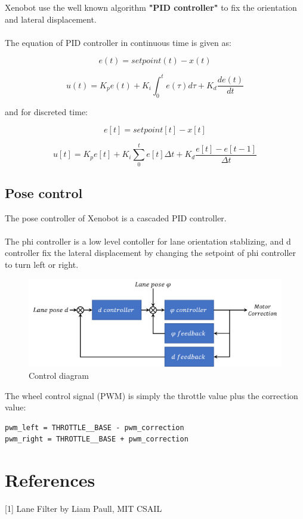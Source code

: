 \documentclass{article}
\begin{document}
Xenobot use the well known algorithm \textbf{"PID controller"} to fix the orientation and lateral displacement.
\\
\\
The equation of PID controller in continuous time is given as:

\[e(t) = setpoint(t) - x(t)\]

\[u(t) = K_p e(t) + K_i \int_{0}^{t} e(\tau) d\tau + K_d  \frac{de(t)}{dt}\]

\noindent and for discreted time:

\[e[t] = setpoint[t] - x[t]\]

\[u[t] = K_p e[t] + K_i \sum_0^t e[t] \Delta t + K_d \frac{e[t] - e[t-1]}{\Delta t}\]

\subsection{Pose control}

The pose controller of Xenobot is a cascaded PID controller.
\\
\\
The phi controller is a low level contoller for lane orientation stablizing, and d controller fix the lateral displacement by changing the setpoint of phi controller to turn left or right.

\begin{figure}[ht]
  \label{fig:control_diagram}
  \centering
  \includegraphics[scale=0.6]{graphs/control_diagram.PNG}
  \caption{Control diagram}
\end{figure}
\FloatBarrier

\noindent The wheel control signal (PWM) is simply the throttle value plus the correction value:

\begin{lstlisting}
pwm_left = THROTTLE__BASE - pwm_correction
pwm_right = THROTTLE__BASE + pwm_correction
\end{lstlisting}

\clearpage

\section{References}

[1] Lane Filter by Liam Paull, MIT CSAIL
\end{document}
